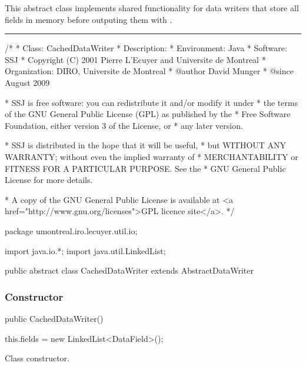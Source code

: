 
This abstract class implements shared functionality for data writers that store
all fields in memory before outputing them with .

\bigskip\hrule

\begin{code}
\begin{hide}
/*
 * Class:        CachedDataWriter
 * Description:  
 * Environment:  Java
 * Software:     SSJ 
 * Copyright (C) 2001  Pierre L'Ecuyer and Universite de Montreal
 * Organization: DIRO, Universite de Montreal
 * @author       David Munger 
 * @since        August 2009

 * SSJ is free software: you can redistribute it and/or modify it under
 * the terms of the GNU General Public License (GPL) as published by the
 * Free Software Foundation, either version 3 of the License, or
 * any later version.

 * SSJ is distributed in the hope that it will be useful,
 * but WITHOUT ANY WARRANTY; without even the implied warranty of
 * MERCHANTABILITY or FITNESS FOR A PARTICULAR PURPOSE.  See the
 * GNU General Public License for more details.

 * A copy of the GNU General Public License is available at
   <a href="http://www.gnu.org/licenses">GPL licence site</a>.
 */
\end{hide}
package umontreal.iro.lecuyer.util.io;
\begin{hide}
import java.io.*;
import java.util.LinkedList;
\end{hide}

public abstract class CachedDataWriter extends AbstractDataWriter \begin{hide} {

   // don't use a map because ordering is important
   protected LinkedList<DataField> fields;

   protected LinkedList<DataField> getFields() {
      return fields;
   }
\end{hide}
\end{code}

\subsubsection*{Constructor}
\begin{code}

   public CachedDataWriter() \begin{hide} {
      this.fields = new LinkedList<DataField>();
   }
   \end{hide}
\end{code}
\begin{tabb}
Class constructor.
\end{tabb}
   
